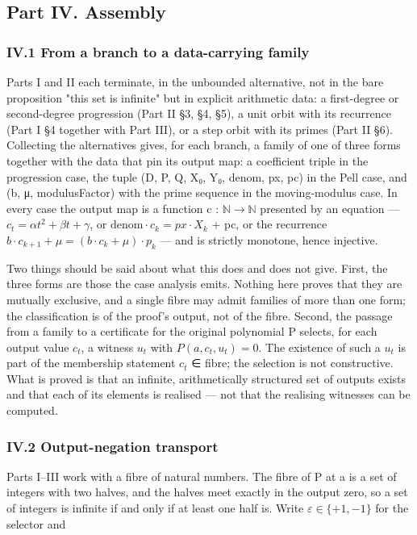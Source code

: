 \documentclass[11pt]{article}
\theoremstyle{plain}
\theoremstyle{definition}
\theoremstyle{remark}
\theoremstyle{plain}
\theoremstyle{definition}
\theoremstyle{remark}
\newcounter{Part}
\theoremstyle{plain}
\theoremstyle{definition}
\theoremstyle{remark}
\begin{document}
\subsection*{Part IV. Assembly}
\subsubsection*{IV.1 From a branch to a data-carrying family}
Parts I and II each terminate, in the unbounded alternative, not in the bare proposition "this set is infinite" but in explicit arithmetic data: a first-degree or second-degree progression (Part II §3, §4, §5), a unit orbit with its recurrence (Part I §4 together with Part III), or a step orbit with its primes (Part II §6). Collecting the alternatives gives, for each branch, a family of one of three forms together with the data that pin its output map: a coefficient triple in the progression case, the tuple (D, P, Q, X₀, Y₀, denom, px, pc) in the Pell case, and (b, μ, modulusFactor) with the prime sequence in the moving-modulus case. In every case the output map is a function c : $ℕ → ℕ$ presented by an equation — $c_{t} = αt^{2} + βt + γ$, or $\mathrm{denom}·c_{k} = px·X_{k}$ + pc, or the recurrence $b·c_{k+1} + μ = (b·c_{k} + μ)·p_{k}$ — and is strictly monotone, hence injective.

Two things should be said about what this does and does not give. First, the three forms are those the case analysis emits. Nothing here proves that they are mutually exclusive, and a single fibre may admit families of more than one form; the classification is of the proof's output, not of the fibre. Second, the passage from a family to a certificate for the original polynomial P selects, for each output value $c_{t}$, a witness $u_{t}$ with $P(a, c_{t}, u_{t}) = 0$. The existence of such a $u_{t}$ is part of the membership statement $c_{t}$ ∈ fibre; the selection is not constructive. What is proved is that an infinite, arithmetically structured set of outputs exists and that each of its elements is realised — not that the realising witnesses can be computed.

\subsubsection*{IV.2 Output-negation transport}
Parts I–III work with a fibre of natural numbers. The fibre of P at a is a set of integers with two halves, and the halves meet exactly in the output zero, so a set of integers is infinite if and only if at least one half is. Write $ε ∈ \{+1, −1\}$ for the selector and
\end{document}

